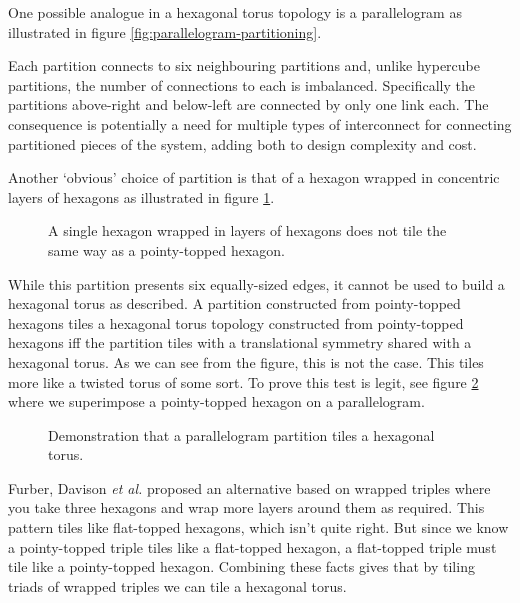 			One possible analogue in a hexagonal torus topology is a parallelogram as
			illustrated in figure \ref{fig:parallelogram-partitioning}.
			
			Each partition connects to six neighbouring partitions and, unlike
			hypercube partitions, the number of connections to each is imbalanced.
			Specifically the partitions above-right and below-left are connected by
			only one link each. The consequence is potentially a need for multiple
			types of interconnect for connecting partitioned pieces of the system,
			adding both to design complexity and cost.
			
			Another `obvious' choice of partition is that of a hexagon wrapped in
			concentric layers of hexagons as illustrated in figure
			\ref{fig:wrapped-hexagon-tiling}.
			
			\begin{figure}
				\center
				
				\caption{A single hexagon wrapped in layers of hexagons does not tile the
				same way as a pointy-topped hexagon.}
				\label{fig:wrapped-hexagon-tiling}
			\end{figure}
			
			While this partition presents six equally-sized edges, it cannot be used
			to build a hexagonal torus as described. A partition constructed from
			pointy-topped hexagons tiles a hexagonal torus topology constructed from
			pointy-topped hexagons iff the partition tiles with a translational
			symmetry shared with a hexagonal torus. As we can see from the figure,
			this is not the case. This tiles more like a twisted torus of some sort.
			To prove this test is legit, see figure \ref{fig:parallelogram-tiling}
			where we superimpose a pointy-topped hexagon on a parallelogram.
			
			\begin{figure}
				\center
				
				\caption{Demonstration that a parallelogram partition tiles a hexagonal
				torus.}
				\label{fig:parallelogram-tiling}
			\end{figure}
			
			Furber, Davison \emph{et al.} \cite{davidsonWiring} proposed an
			alternative based on wrapped triples where you take three hexagons and
			wrap more layers around them as required. This pattern tiles like
			flat-topped hexagons, which isn't quite right. But since we know a
			pointy-topped triple tiles like a flat-topped hexagon, a flat-topped
			triple must tile like a pointy-topped hexagon. Combining these facts
			gives that by tiling triads of wrapped triples we can tile a hexagonal
			torus.
			

